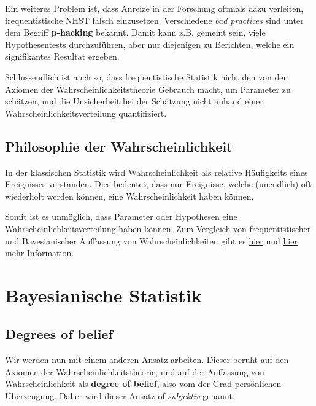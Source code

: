 \documentclass[]{tufte-handout}
\begin{document}
Ein weiteres Problem ist, dass Anreize in der Forschung oftmals dazu
verleiten, frequentistische NHST falsch einzusetzen. Verschiedene
\emph{bad practices} sind unter dem Begriff \textbf{p-hacking} bekannt.
Damit kann z.B. gemeint sein, viele Hypothesentests durchzuführen, aber
nur diejenigen zu Berichten, welche ein signifikantes Resultat ergeben.

Schlussendlich ist auch so, dass frequentistische Statistik nicht den
von den Axiomen der Wahrscheinlichkeitstheorie Gebrauch macht, um
Parameter zu schätzen, und die Unsicherheit bei der Schätzung nicht
anhand einer Wahrscheinlichkeitsverteilung quantifiziert.

\hypertarget{philosophie-der-wahrscheinlichkeit}{%
\subsection{Philosophie der
Wahrscheinlichkeit}\label{philosophie-der-wahrscheinlichkeit}}

In der klassischen Statistik wird Wahrscheinlichkeit als relative
Häufigkeits eines Ereignisses verstanden. Dies bedeutet, dass nur
Ereignisse, welche (unendlich) oft wiederholt werden können, eine
Wahrscheinlichkeit haben können.

Somit ist es unmöglich, dass Parameter oder Hypothesen eine
Wahrscheinlichkeitsverteilung haben können. Zum Vergleich von
frequentistischer und Bayesianischer Auffassung von Wahrscheinlichkeiten
gibt es
\href{https://de.wikipedia.org/wiki/Frequentistischer_Wahrscheinlichkeitsbegriff}{hier}
und
\href{https://de.wikipedia.org/wiki/Bayessche_Statistik\#Der_bayessche_Wahrscheinlichkeitsbegriff}{hier}
mehr Information.

\hypertarget{bayesianische-statistik}{%
\section{Bayesianische Statistik}\label{bayesianische-statistik}}

\hypertarget{degrees-of-belief}{%
\subsection{Degrees of belief}\label{degrees-of-belief}}

Wir werden nun mit einem anderen Ansatz arbeiten. Dieser beruht auf den
Axiomen der Wahrscheinlichkeitstheorie, und auf der Auffassung von
Wahrscheinlichkeit als \textbf{degree of belief}, also vom der Grad
persönlichen Überzeugung. Daher wird dieser Ansatz of \emph{subjektiv}
genannt.
\end{document}
